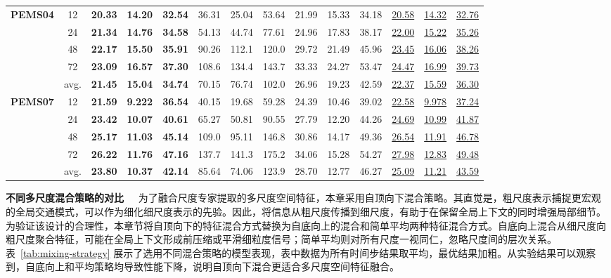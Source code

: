 \begin{table}[t!]
{\begin{tabular}{cc|ccc|ccc|ccc|ccc}
      \multirow{5}{*}{\textbf{PEMS04}} 
      & 12  & \textbf{20.33} & \textbf{14.20} & \textbf{32.54} & 36.31 & 25.04 & 53.64  & 21.99 & 15.33 & 34.18 & \underline{20.58} & \underline{14.32} & \underline{32.76} \\
      & 24  & \textbf{21.34} & \textbf{14.76} & \textbf{34.58} & 54.13 & 44.74 & 77.61  & 24.96 & 17.83 & 38.17 & \underline{22.00} & \underline{15.22} & \underline{35.26} \\
      & 48  & \textbf{22.17} & \textbf{15.50} & \textbf{35.91} & 90.26 & 112.1 & 120.0  & 29.72 & 21.49 & 45.96 & \underline{23.45} & \underline{16.06} & \underline{38.26} \\
      & 72  & \textbf{23.09} & \textbf{16.57} & \textbf{37.30} & 108.6 & 134.4 & 143.7  & 33.33 & 24.27 & 53.47 & \underline{24.47} & \underline{16.99} & \underline{39.73} \\
      & avg.& \textbf{21.45} & \textbf{15.04} & \textbf{34.74} & 70.15 & 76.74 & 102.0  & 26.96 & 19.23 & 42.59 & \underline{22.37} & \underline{15.59} & \underline{36.30} \\
      \midrule
      
      \multirow{5}{*}{\textbf{PEMS07}} 
      & 12  & \textbf{21.59} & \textbf{9.222} & \textbf{36.54} & 40.15  & 19.68 & 59.28  & 24.39 & 10.46 & 39.02 & \underline{22.58} & \underline{9.978} & \underline{37.24} \\
      & 24  & \textbf{23.42} & \textbf{10.07} & \textbf{40.61} & 65.27  & 50.81 & 90.55  & 27.79 & 12.20 & 44.26 & \underline{24.69} & \underline{10.99} & \underline{41.87} \\
      & 48  & \textbf{25.17} & \textbf{11.03} & \textbf{45.14} & 109.0  & 95.11 & 146.8  & 30.86 & 14.17 & 49.36 & \underline{26.54} & \underline{11.91} & \underline{46.78} \\
      & 72  & \textbf{26.22} & \textbf{11.76} & \textbf{47.16} & 137.7  & 141.3 & 175.2  & 34.06 & 15.28 & 54.27 & \underline{27.98} & \underline{12.83} & \underline{49.48} \\
      & avg.& \textbf{23.80} & \textbf{10.37} & \textbf{42.14} & 85.64  & 74.06 & 123.9  & 28.70 & 12.77 & 46.27 & \underline{25.09} & \underline{11.21} & \underline{43.59} \\
      
      \bottomrule
    \end{tabular}%
  }
\end{table}

\noindent\textbf{不同多尺度混合策略的对比\ \ } 为了融合尺度专家提取的多尺度空间特征，本章采用自顶向下混合策略。其直觉是，粗尺度表示捕捉更宏观的全局交通模式，可以作为细化细尺度表示的先验。因此，将信息从粗尺度传播到细尺度，有助于在保留全局上下文的同时增强局部细节。为验证该设计的合理性，本章节将自顶向下的特征混合方式替换为自底向上的混合和简单平均两种特征混合方式。自底向上混合从细尺度向粗尺度聚合特征，可能在全局上下文形成前压缩或平滑细粒度信号；简单平均则对所有尺度一视同仁，忽略尺度间的层次关系。表~\ref{tab:mixing-strategy} 展示了选用不同混合策略的模型表现，表中数据为所有时间步结果取平均，最优结果加粗。从实验结果可以观察到，自底向上和平均策略均导致性能下降，说明自顶向下混合更适合多尺度空间特征融合。

